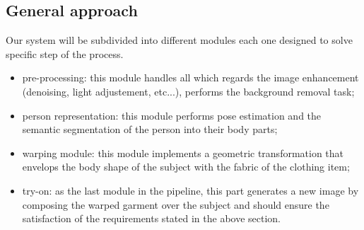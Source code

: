 \begin{multicols}{2}
\subsection{General approach}
Our system will be subdivided into different modules each one designed to solve specific step of the process.
\begin{itemize}
\item pre-processing: this module handles all which regards the image enhancement (denoising, light adjustement, etc...), performs the background removal task;

\item person representation: this module performs pose estimation and the semantic segmentation of the person into their body parts;

\item warping module: this module implements a geometric transformation that envelops the body shape of the subject with the fabric of the clothing item;

\item try-on: as the last module in the pipeline, this part generates a new image by composing the warped garment over the subject and should ensure the satisfaction of the requirements stated in the above section.
\end{itemize}


\end{multicols}